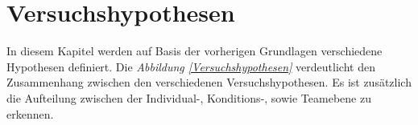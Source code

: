 \documentclass[a4paper,11pt]{article}%
\renewcommand{\\}{\vspace*{0.5\baselineskip} \newline}
\begin{document}
%		
%		
%		
		
		


\newpage
\section{Versuchshypothesen}
\label{VersuchshypothesenAuflistung}

In diesem Kapitel werden auf Basis der vorherigen Grundlagen verschiedene Hypothesen definiert.
Die \textit{Abbildung \ref{Versuchshypothesen}} verdeutlicht den Zusammenhang zwischen den verschiedenen Versuchshypothesen. Es ist zusätzlich die Aufteilung zwischen der Individual-, Konditions-, sowie Teamebene zu erkennen.
\end{document}
